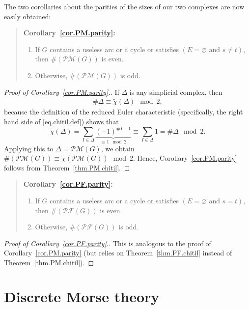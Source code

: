 \documentclass[12pt]{amsart}
\theoremstyle{definition}
\newenvironment{statement}{\begin{quote}}{\end{quote}}
\newcommand{\tup}[1]{\left( #1 \right)}
\newcommand{\chitil}{\widetilde{\chi}}
\newcommand{\Pm}[1]{\mathcal{PM}\left(#1\right)}
\newcommand{\Pf}[1]{\mathcal{PF}\left(#1\right)}
\begin{document}
The two corollaries about the parities of the sizes of our two complexes are now easily obtained:

\begin{statement} \textbf{Corollary~\ref{cor.PM.parity}:}
\begin{enumerate}
    \item[(a)] If $G$ contains a useless arc or a cycle or satisfies $\tup{E = \varnothing \text{ and } s \neq t}$, then $\# \tup{\Pm{G}}$ is even.
    \item[(b)] Otherwise, $\# \tup{\Pm{G}}$ is odd.
\end{enumerate}
\end{statement}

\begin{proof}[Proof of Corollary~\ref{cor.PM.parity}.]
If $\Delta$ is any simplicial complex, then
\begin{align}
\# \Delta \equiv \chitil\tup{\Delta} \mod 2 ,
\label{pf.cor.PM.parity.1}
\end{align}
because the definition of the reduced Euler characteristic (specifically, the right hand side of \eqref{eq.chitil.def}) shows that
\[
\chitil\tup{\Delta}
= \sum_{I \in \Delta} \underbrace{\tup{-1}^{\# I - 1}}_{\equiv 1 \mod 2}
\equiv \sum_{I \in \Delta} 1 = \# \Delta \mod 2 .
\]
Applying this to $\Delta = \Pm{G}$, we obtain
$\# \tup{\Pm{G}} \equiv \chitil\tup{\Pm{G}} \mod 2$.
Hence, Corollary~\ref{cor.PM.parity} follows from
Theorem~\ref{thm.PM.chitil}.
\end{proof}

\begin{statement} \textbf{Corollary~\ref{cor.PF.parity}:}
\begin{enumerate}
    \item[(a)] If $G$ contains a useless arc or a cycle or satisfies $\tup{E = \varnothing \text{ and } s = t}$, then $\# \tup{\Pf{G}}$ is even.
    \item[(b)] Otherwise, $\# \tup{\Pf{G}}$ is odd.
\end{enumerate}
\end{statement}

\begin{proof}[Proof of Corollary~\ref{cor.PF.parity}.]
This is analogous to the proof of Corollary~\ref{cor.PM.parity}
(but relies on Theorem~\ref{thm.PF.chitil} instead of
Theorem~\ref{thm.PM.chitil}).
\end{proof}

\section{\label{sect.dmt}Discrete Morse theory}
\end{document}
